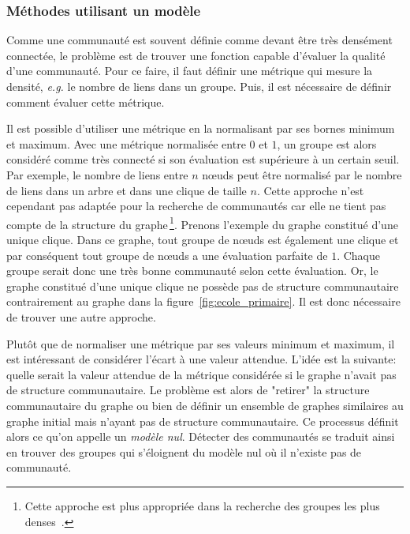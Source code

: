 \subsubsection{Méthodes utilisant un modèle}
\label{def:Modularite}
Comme une communauté est souvent définie comme devant être très densément connectée, le problème est de trouver une fonction capable d'évaluer la qualité d'une communauté.
Pour ce faire, il faut définir une métrique qui mesure la densité, \emph{e.g.} le nombre de liens dans un groupe.
Puis, il est nécessaire de définir comment évaluer cette métrique.

Il est possible d'utiliser une métrique en la normalisant par ses bornes minimum et maximum.
Avec une métrique normalisée entre $0$ et $1$, un groupe est alors considéré comme très connecté si son évaluation est supérieure à un certain seuil.
Par exemple, le nombre de liens entre $n$ n\oe{}uds peut être normalisé par le nombre de liens dans un arbre et dans une clique de taille $n$. 
Cette approche n'est cependant pas adaptée pour la recherche de communautés car elle ne tient pas compte de la structure du graphe\,\footnote{Cette approche est plus appropriée dans la recherche des groupes les plus denses~\cite{Balalau2015}.}.
Prenons l'exemple du graphe constitué d'une unique clique.
Dans ce graphe, tout groupe de n\oe{}uds est également une clique et par conséquent tout groupe de n\oe{}uds a une évaluation parfaite de $1$.
Chaque groupe serait donc une très bonne communauté selon cette évaluation.
Or, le graphe constitué d'une unique clique ne possède pas de structure communautaire contrairement au graphe dans la figure~\ref{fig:ecole_primaire}.
Il est donc nécessaire de trouver une autre approche.

\bigskip

Plutôt que de normaliser une métrique par ses valeurs minimum et maximum, il est intéressant de considérer l'écart à une valeur attendue.
L'idée est la suivante: quelle serait la valeur attendue de la métrique considérée si le graphe n'avait pas de structure communautaire.
Le problème est alors de "retirer" la structure communautaire du graphe ou bien de définir un ensemble de graphes similaires au graphe initial mais n'ayant pas de structure communautaire.
Ce processus définit alors ce qu'on appelle un \emph{modèle nul}.
Détecter des communautés se traduit ainsi en trouver des groupes qui s'éloignent du modèle nul où il n'existe pas de communauté.

